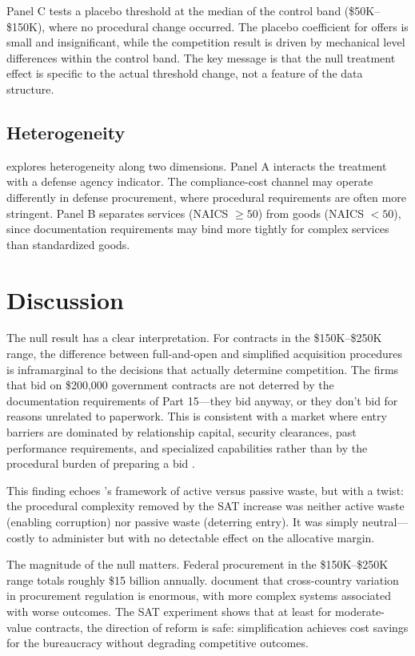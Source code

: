 \documentclass[12pt]{article}
\begin{document}
Panel C tests a placebo threshold at the median of the control band (\$50K--\$150K), where no procedural change occurred. The placebo coefficient for offers is small and insignificant, while the competition result is driven by mechanical level differences within the control band. The key message is that the null treatment effect is specific to the actual threshold change, not a feature of the data structure.

\subsection{Heterogeneity}



 explores heterogeneity along two dimensions. Panel A interacts the treatment with a defense agency indicator. The compliance-cost channel may operate differently in defense procurement, where procedural requirements are often more stringent. Panel B separates services (NAICS $\geq 50$) from goods (NAICS $< 50$), since documentation requirements may bind more tightly for complex services than standardized goods.

\section{Discussion}

The null result has a clear interpretation. For contracts in the \$150K--\$250K range, the difference between full-and-open and simplified acquisition procedures is inframarginal to the decisions that actually determine competition. The firms that bid on \$200,000 government contracts are not deterred by the documentation requirements of Part 15---they bid anyway, or they don't bid for reasons unrelated to paperwork. This is consistent with a market where entry barriers are dominated by relationship capital, security clearances, past performance requirements, and specialized capabilities rather than by the procedural burden of preparing a bid \citep{best2023, decarolis2020}.

This finding echoes \citet{bandiera2009}'s framework of active versus passive waste, but with a twist: the procedural complexity removed by the SAT increase was neither active waste (enabling corruption) nor passive waste (deterring entry). It was simply neutral---costly to administer but with no detectable effect on the allocative margin.

The magnitude of the null matters. Federal procurement in the \$150K--\$250K range totals roughly \$15 billion annually. \citet{bosio2022} document that cross-country variation in procurement regulation is enormous, with more complex systems associated with worse outcomes. The SAT experiment shows that at least for moderate-value contracts, the direction of reform is safe: simplification achieves cost savings for the bureaucracy without degrading competitive outcomes.
\end{document}
